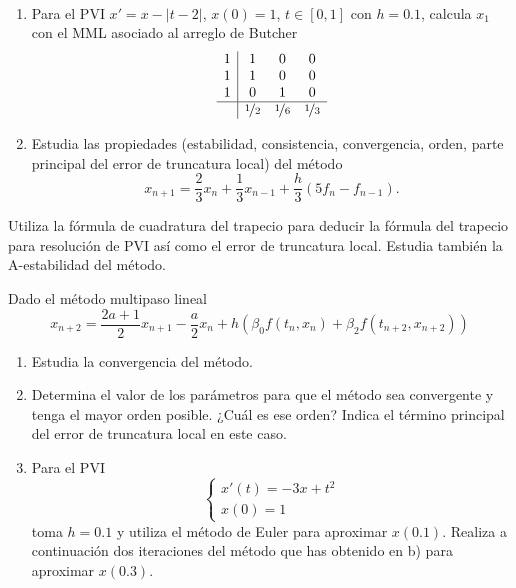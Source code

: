 \begin{ejercicio}~
    \begin{enumerate}
        \item Para el PVI $x' = x - |t - 2|$, $x(0) = 1$, $t \in [0, 1]$ con $h = 0.1$, calcula $x_1$ con el MML asociado al arreglo de Butcher
            \begin{equation*}
                \begin{array}{c|ccc}
                    1 & 1 & 0 & 0 \\
                    1 & 1 & 0 & 0 \\
                    1 & 0 & 1 & 0 \\ \hline
                    & \nicefrac{1}{2} & \nicefrac{1}{6} & \nicefrac{1}{3}
                \end{array}
            \end{equation*}
        \item Estudia las propiedades (estabilidad, consistencia, convergencia, orden, parte principal del error de truncatura local) del método
        \begin{equation*}
            x_{n+1} = \frac{2}{3} x_n + \frac{1}{3} x_{n-1} + \frac{h}{3} (5 f_n - f_{n-1}).
        \end{equation*}
    \end{enumerate}
\end{ejercicio}

\begin{ejercicio}
    Utiliza la fórmula de cuadratura del trapecio para deducir la fórmula del trapecio para resolución de PVI así como el error de truncatura local. Estudia también la A-estabilidad del método.
\end{ejercicio}

\begin{ejercicio}
    Dado el método multipaso lineal
    \begin{equation*}
        x_{n+2} = \frac{2a + 1}{2} x_{n+1} - \frac{a}{2} x_n + h \left( \beta_0 f(t_n, x_n) + \beta_2 f(t_{n+2}, x_{n+2}) \right)
    \end{equation*}
    \begin{enumerate}
        \item Estudia la convergencia del método.
        \item Determina el valor de los parámetros para que el método sea convergente y tenga el mayor orden posible. ¿Cuál es ese orden? Indica el término principal del error de truncatura local en este caso.
        \item Para el PVI
            \begin{equation*}
                \begin{cases}
                    x'(t) = -3x + t^2 \\
                    x(0) = 1
                \end{cases}
            \end{equation*}
            toma $h = 0.1$ y utiliza el método de Euler para aproximar $x(0.1)$. Realiza a continuación dos iteraciones del método que has obtenido en b) para aproximar $x(0.3)$.
    \end{enumerate}
\end{ejercicio}

